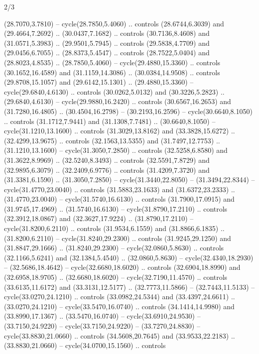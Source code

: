 \begin{flagdescription}{2/3}
\begin{scope}[yshift=\flagwidth,scale=\flagwidth/1241.93737]
\begin{scope}[y=-1mm, x=1mm,draw=gold,fill=blue,line join=miter,miter limit=4,line width=1.8\lw]
\begin{scope}[y=1mm, x=1mm, yscale=-1,shift={(573.68mm+\str,145.75)}]
\begin{scope}[scale=1.35,shift={(-9,-3)}]
\begin{scope}[scale=0.55]
\begin{scope}[scale=1.333]
    (28.7070,3.7810) -- cycle(28.7850,5.4060) .. controls (28.6744,6.3039) and
    (29.4664,7.2692) .. (30.0437,7.1682) .. controls (30.7136,8.4608) and
    (31.0571,5.3983) .. (29.9501,5.7945) .. controls (29.5838,4.7709) and
    (29.0456,6.7055) .. (28.8373,5.4547) .. controls (28.7522,5.0404) and
    (28.8023,4.8535) .. (28.7850,5.4060) -- cycle(29.4880,15.3360) .. controls
    (30.1652,16.4589) and (31.1159,14.3086) .. (30.0384,14.9508) .. controls
    (29.8708,15.1057) and (29.6142,15.1301) .. (29.4880,15.3360) --
    cycle(29.6840,4.6130) .. controls (30.0262,5.0132) and (30.3226,5.2823) ..
    (29.6840,4.6130) -- cycle(29.9880,16.2420) .. controls (30.6567,16.2653) and
    (31.7280,16.4805) .. (30.4504,16.2798) -- (30.2193,16.2596) --
    cycle(30.6640,8.1050) .. controls (31.1712,7.9441) and (31.1308,7.7481) ..
    (30.6640,8.1050) -- cycle(31.1210,13.1600) .. controls (31.3029,13.8162) and
    (33.3828,15.6272) .. (32.4299,13.9675) .. controls (32.1563,13.5355) and
    (31.7497,12.7753) .. (31.1210,13.1600) -- cycle(31.3050,7.2850) .. controls
    (32.5258,6.8580) and (31.3622,8.9969) .. (32.5240,8.3493) .. controls
    (32.5591,7.8729) and (32.9895,6.3079) .. (32.2409,6.9776) .. controls
    (31.4209,7.3720) and (31.3381,6.1590) .. (31.3050,7.2850) --
    cycle(31.3440,22.8050) -- (31.3494,22.8344) -- cycle(31.4770,23.0040) ..
    controls (31.5883,23.1633) and (31.6372,23.2333) .. (31.4770,23.0040) --
    cycle(31.5740,16.6130) .. controls (31.7900,17.0915) and (31.9745,17.4969) ..
    (31.5740,16.6130) -- cycle(31.8790,17.2110) .. controls (32.3912,18.0867) and
    (32.3627,17.9224) .. (31.8790,17.2110) -- cycle(31.8200,6.2110) .. controls
    (31.9534,6.1559) and (31.8866,6.1835) .. (31.8200,6.2110) --
    cycle(31.8240,29.2300) .. controls (31.9245,29.1250) and (31.8847,29.1666) ..
    (31.8240,29.2300) -- cycle(32.0860,5.8630) .. controls (32.1166,5.6241) and
    (32.1384,5.4540) .. (32.0860,5.8630) -- cycle(32.4340,18.2930) --
    (32.5686,18.4642) -- cycle(32.6680,18.6020) .. controls (32.6904,18.8990) and
    (32.6958,18.9705) .. (32.6680,18.6020) -- cycle(32.7190,11.4570) .. controls
    (33.6135,11.6172) and (33.3131,12.5177) .. (32.7773,11.5866) --
    (32.7443,11.5133) -- cycle(33.0270,24.1210) .. controls (33.0982,24.5344) and
    (33.4397,24.6611) .. (33.0270,24.1210) -- cycle(33.5470,16.0740) .. controls
    (34.1414,14.9980) and (33.8990,17.1367) .. (33.5470,16.0740) --
    cycle(33.6910,24.9530) -- (33.7150,24.9220) -- cycle(33.7150,24.9220) --
    (33.7270,24.8830) -- cycle(33.8830,21.0660) .. controls (34.5608,20.7645) and
    (33.9533,22.2183) .. (33.8830,21.0660) -- cycle(34.0700,15.1560) .. controls

\end{scope}
\end{scope}
\end{scope}
\end{scope}
\end{scope}
\end{scope}
\end{flagdescription}
